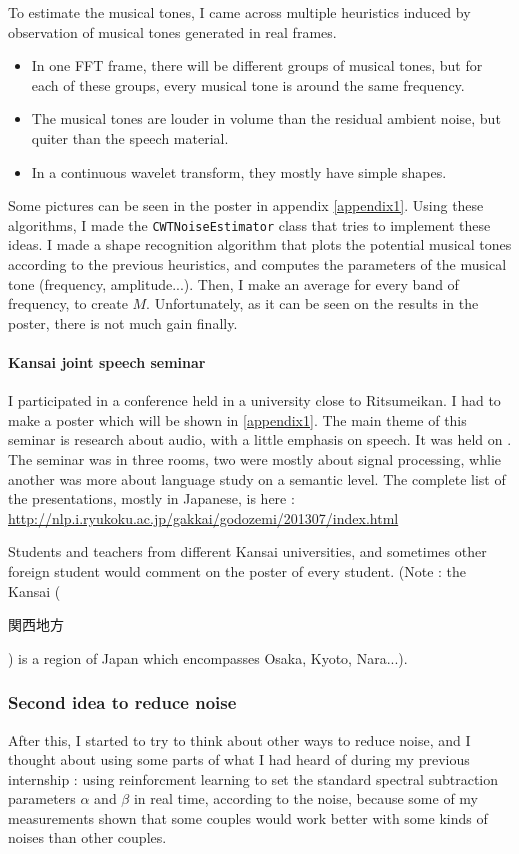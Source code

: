 To estimate the musical tones, I came across multiple heuristics induced by observation of musical tones generated in real frames.

\begin{itemize}
\item In one FFT frame, there will be different groups of musical tones, but for each of these groups, every musical tone is around the same frequency.
\item The musical tones are louder in volume than the residual ambient noise, but quiter than the speech material.
\item In a continuous wavelet transform, they mostly have simple shapes.
\end{itemize}
Some pictures can be seen in the poster in appendix \ref{appendix1}.
Using these algorithms, I made the \texttt{CWTNoiseEstimator} class that tries to implement these ideas. I made a shape recognition algorithm that plots the potential musical tones according to the previous heuristics, and computes the parameters of the musical tone (frequency, amplitude...). Then, I make an average for every band of frequency, to create $M$. Unfortunately, as it can be seen on the results in the poster, there is not much gain finally.
\paragraph{Kansai joint speech seminar}
I participated in a conference held in a university close to Ritsumeikan. I had to make a poster which will be shown in \ref{appendix1}.
The main theme of this seminar is research about audio, with a little emphasis on speech. It was held on . The seminar was in three rooms, two were mostly about signal processing, whlie another was more about language study on a semantic level. The complete list of the presentations, mostly in Japanese, is here : \url{http://nlp.i.ryukoku.ac.jp/gakkai/godozemi/201307/index.html}

Students and teachers from different Kansai universities, and sometimes other foreign student would comment on the poster of every student.
(Note : the Kansai (\begin{CJK}{UTF8}{min}関西地方\end{CJK}) is a region of Japan which encompasses Osaka, Kyoto, Nara...).

\subsubsection{Second idea to reduce noise}
After this, I started to try to think about other ways to reduce noise, and I thought about using some parts of what I had heard of during my previous internship : using reinforcment learning to set the standard spectral subtraction parameters $\alpha$ and $\beta$ in real time, according to the noise, because some of my measurements shown that some couples would work better with some kinds of noises than other couples.

